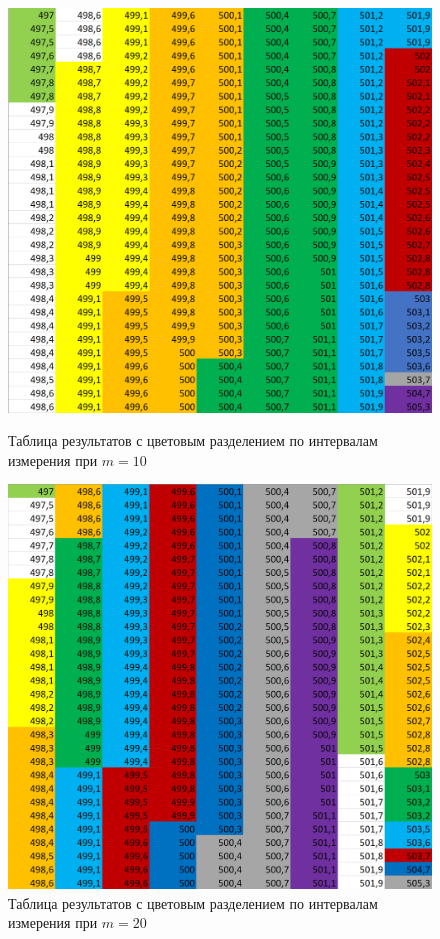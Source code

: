 \documentclass[a4paper, 12pt]{article}
\begin{document}
    \begin{figure}
        \begin{minipage}{0.48\textwidth}
        \centering
         \includegraphics[width=1\linewidth]{Table m10.png}
        \caption{Таблица результатов с цветовым разделением по интервалам измерения при $m = 10$}
        \end{minipage}\hfill
        \begin{minipage}{0.48\textwidth}
        \centering
        \includegraphics[width=1\linewidth]{Table m20.png}
        \caption{Таблица результатов с цветовым разделением по интервалам измерения при $m = 20$}
        \end{minipage}
    \end{figure}
\end{document}
